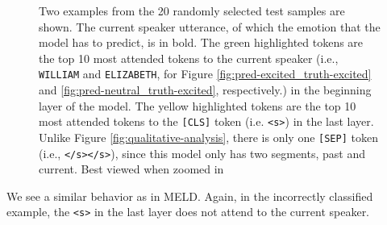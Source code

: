\documentclass[11pt]{article}
\begin{document}
\begin{figure}[h]
  \centering
  \hfill
  \caption{Two examples from the 20 randomly selected test samples are shown. The current speaker utterance, of which the emotion that the model has to predict, is in bold. The green highlighted tokens are the top 10 most attended tokens to the current speaker (i.e., \texttt{WILLIAM} and \texttt{ELIZABETH}, for Figure \ref{fig:pred-excited_truth-excited} and \ref{fig:pred-neutral_truth-excited}, respectively.) in the beginning layer of the model. The yellow highlighted tokens are the top 10 most attended tokens to the \texttt{[CLS]} token (i.e. \texttt{<s>}) in the last layer. Unlike Figure \ref{fig:qualitative-analysis}, there is only one \texttt{[SEP]} token (i.e., \texttt{</s></s>}), since this model only has two segments, past and current. Best viewed when zoomed in}
  \label{fig:qualitative-analysis-iemocap}
\end{figure}

We see a similar behavior as in MELD. Again, in the incorrectly classified example, the \texttt{<s>} in the last layer does not attend to the current speaker.
\end{document}
